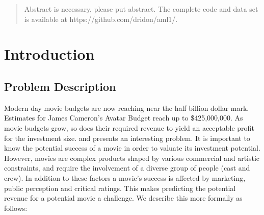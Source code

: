 \documentclass[conference]{IEEEtran}
\begin{document}




\maketitle


\begin{abstract}
Abstract is necessary, please put abstract. The complete code and data set is 
available at https://github.com/dridon/aml1/. 
\end{abstract}





%
\IEEEpeerreviewmaketitle

\section{Introduction}
\subsection{Problem Description}
Modern day movie budgets are now reaching near the half billion dollar 
mark. Estimates for James Cameron's Avatar Budget reach up to
\$425,000,000\cite{topmovies}. As movie budgets grow, so does their
required revenue to yield an acceptable profit for the investment size.
and presents an interesting problem. It is important to know the potential 
success of a movie in order to valuate its investment potential. However, 
movies are complex products shaped by various commercial
and artistic constraints, and require the involvement of
a diverse group of people (cast and crew). In addition to these factors 
a movie's success is affected by marketing, public perception 
and critical ratings. This makes predicting the potential 
revenue for a potential movie a challenge. We describe this more formally 
as follows: 
\end{document}
